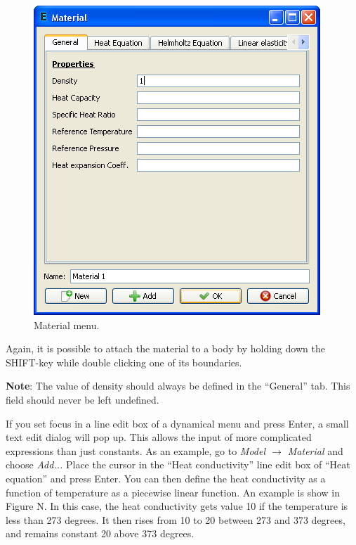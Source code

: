 \documentclass[a4paper,12pt]{article}
\begin{document}
\begin{figure}[ht]
\begin{center}
 \includegraphics[scale=0.5]{images/material.png}
\caption{Material menu.}
\end{center}
\end{figure}

Again, it is possible to attach the material to a body by holding down the SHIFT-key while double clicking one of its boundaries.

\vskip2mm

{\bf Note}: The value of density should always be defined in the ``General'' tab. This
field should never be left undefined.

\vskip2mm

If you set focus in a line edit box of a dynamical menu and press Enter, a small
text edit dialog will pop up. This allows the input of more complicated expressions
than just constants. As an example, go to {\it Model $\rightarrow$ Material} and choose
{\it Add...} Place the cursor in the ``Heat conductivity'' line edit box of ``Heat
equation'' and press Enter. You can then define the heat conductivity
as a function of temperature as a piecewise linear function. An example is show in
Figure N. In this case, the heat conductivity gets value 10 if the temperature is less
than 273 degrees. It then rises from 10 to 20 between 273 and 373 degrees, and
remains constant 20 above 373 degrees.
\end{document}
